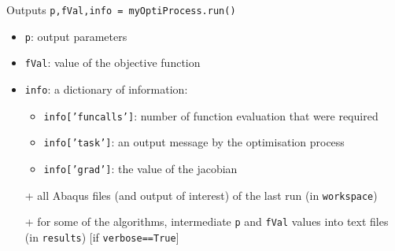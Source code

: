 \begin{frame}{Outputs}
\texttt{p,fVal,info = myOptiProcess.run()}

\begin{itemize}
\item \texttt{p}: output parameters
\item \texttt{fVal}: value of the objective function
\item \texttt{info}: a dictionary of information:
\begin{itemize}
\item \texttt{info['funcalls']}: number of function evaluation that were required
\item \texttt{info['task']}: an output message by the optimisation process
\item \texttt{info['grad']}: the value of the jacobian
\end{itemize}
\item[]
\item[+] all Abaqus files (and output of interest) of the last run (in \texttt{workspace})
\item[+] for some of the algorithms, intermediate \texttt{p} and \texttt{fVal} values into text files (in \texttt{results}) [if \texttt{verbose==True}]
\end{itemize}
\end{frame}
